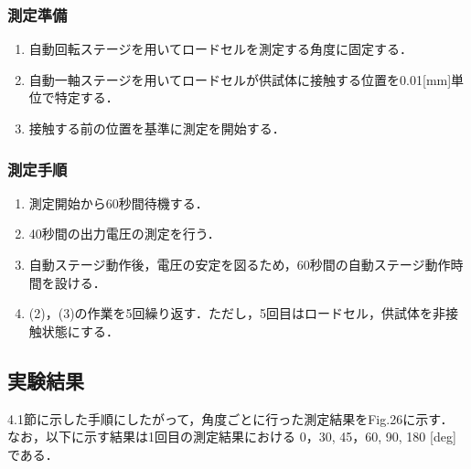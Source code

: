 \subsubsection{測定準備}
\begin{enumerate}[(1)]
  \item 自動回転ステージを用いてロードセルを測定する角度に固定する．
  \item 自動一軸ステージを用いてロードセルが供試体に接触する位置を0.01[mm]単位で特定する．
  \item 接触する前の位置を基準に測定を開始する．
\end{enumerate}
\subsubsection{測定手順}
\begin{enumerate}[(1)]
  \item 測定開始から60秒間待機する．
  \item 40秒間の出力電圧の測定を行う．
  \item 自動ステージ動作後，電圧の安定を図るため，60秒間の自動ステージ動作時間を設ける．
  \item (2)，(3)の作業を5回繰り返す．ただし，5回目はロードセル，供試体を非接触状態にする．
\end{enumerate}

\subsection{実験結果}

4.1節に示した手順にしたがって，角度ごとに行った測定結果をFig.26に示す．
なお，以下に示す結果は1回目の測定結果における 0，30, 45，60, 90, 180 [deg]である．

